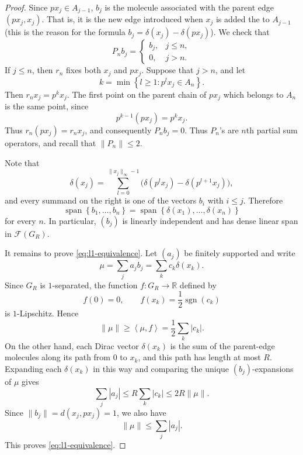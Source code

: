 \documentclass[10pt,a4paper]{amsart}
\newcommand{\F}{\mathcal F}
\def\R{{\mathbb R}}
\newcommand{\abs}[1]{\left\lvert#1\right\rvert}
\newcommand{\angles}[1]{\left\langle#1\right\rangle}
\newcommand{\norm}[1]{\lVert#1\rVert}
\newcommand{\set}[1]{\left\{#1\right\}}
\newcommand{\sgn}{\operatorname{sgn}}
\begin{document}
\begin{proof}
Since $px_j\in A_{j-1}$, $b_j$ is the molecule associated with the parent edge $(px_j, x_j)$. That is, it is the new edge introduced when $x_j$ is added the to $A_{j-1}$ (this is the reason for the formula $b_j=\delta(x_j)-\delta(px_j)$). We check that 
$$
P_nb_j=
\begin{cases}
b_j,&j\leq n,\\
0,&j>n.
\end{cases}
$$
If $j\leq n$, then $r_n$ fixes both $x_j$ and $px_j$.  Suppose that $j>n$,
and let
$$
k=\min\set{l\geq1:p^lx_j\in A_n}.
$$
Then $r_nx_j=p^kx_j$.  The first point on the parent chain of $px_j$ which
belongs to $A_n$ is the same point, since
$$
p^{k-1}(px_j)=p^kx_j.
$$
Thus $r_n(px_j)=r_nx_j$, and consequently $P_nb_j=0$. Thus $P_n$'s are $n$th partial sum operators, and recall that $\norm{P_n}\le 2$.

Note that
$$
\delta(x_j)=\sum_{l=0}^{\norm{x_j}_\infty-1}
\bigl(\delta(p^lx_j)-\delta(p^{l+1}x_j)\bigr),
$$
and every summand on the right is one of the vectors $b_i$ with $i\leq j$.
Therefore
$$
\operatorname{span}\set{b_1,\ldots,b_n}
=\operatorname{span}\set{\delta(x_1),\ldots,\delta(x_n)}
$$
for every $n$.  In particular, $(b_j)$ is linearly independent and has dense
linear span in $\F(G_R)$.

It remains to prove \eqref{eq:l1-equivalence}.  Let $(a_j)$ be finitely
supported and write
$$
\mu=\sum_j a_jb_j=\sum_k c_k\delta(x_k).
$$
Since $G_R$ is $1$-separated, the function $f:G_R\to\R$ defined by
$$
f(0)=0,
\qquad
f(x_k)=\frac12\sgn(c_k)
$$
is $1$-Lipschitz.  Hence
$$
\norm{\mu}\geq\angles{\mu,f}=\frac12\sum_k\abs{c_k}.
$$
On the other hand, each Dirac vector $\delta(x_k)$ is the sum of the
parent-edge molecules along its path from $0$ to $x_k$, and this path has
length at most $R$.  Expanding each $\delta(x_k)$ in this way and comparing
the unique $(b_j)$-expansions of $\mu$ gives
$$
\sum_j\abs{a_j}\leq R\sum_k\abs{c_k}\leq2R\norm{\mu}.
$$
Since $\norm{b_j}=d(x_j,px_j)=1$, we also have
$$
\norm{\mu}\leq\sum_j\abs{a_j}.
$$
This proves \eqref{eq:l1-equivalence}.

\end{proof}
\end{document}
